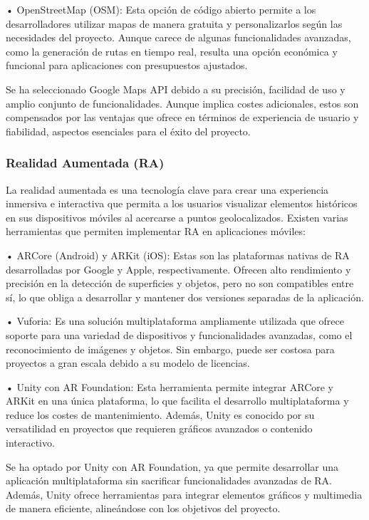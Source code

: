	•	OpenStreetMap (OSM): Esta opción de código abierto permite a los desarrolladores utilizar mapas de manera gratuita y personalizarlos según las necesidades del proyecto. Aunque carece de algunas funcionalidades avanzadas, como la generación de rutas en tiempo real, resulta una opción económica y funcional para aplicaciones con presupuestos ajustados.
    
Se ha seleccionado Google Maps API debido a su precisión, facilidad de uso y amplio conjunto de funcionalidades. Aunque implica costes adicionales, estos son compensados por las ventajas que ofrece en términos de experiencia de usuario y fiabilidad, aspectos esenciales para el éxito del proyecto.

\subsubsection{Realidad Aumentada (RA)}

La realidad aumentada es una tecnología clave para crear una experiencia inmersiva e interactiva que permita a los usuarios visualizar elementos históricos en sus dispositivos móviles al acercarse a puntos geolocalizados. Existen varias herramientas que permiten implementar RA en aplicaciones móviles:

	•	ARCore (Android) y ARKit (iOS): Estas son las plataformas nativas de RA desarrolladas por Google y Apple, respectivamente. Ofrecen alto rendimiento y precisión en la detección de superficies y objetos, pero no son compatibles entre sí, lo que obliga a desarrollar y mantener dos versiones separadas de la aplicación.
    
	•	Vuforia: Es una solución multiplataforma ampliamente utilizada que ofrece soporte para una variedad de dispositivos y funcionalidades avanzadas, como el reconocimiento de imágenes y objetos. Sin embargo, puede ser costosa para proyectos a gran escala debido a su modelo de licencias.
    
	•	Unity con AR Foundation: Esta herramienta permite integrar ARCore y ARKit en una única plataforma, lo que facilita el desarrollo multiplataforma y reduce los costes de mantenimiento. Además, Unity es conocido por su versatilidad en proyectos que requieren gráficos avanzados o contenido interactivo.
    
Se ha optado por Unity con AR Foundation, ya que permite desarrollar una aplicación multiplataforma sin sacrificar funcionalidades avanzadas de RA. Además, Unity ofrece herramientas para integrar elementos gráficos y multimedia de manera eficiente, alineándose con los objetivos del proyecto.

